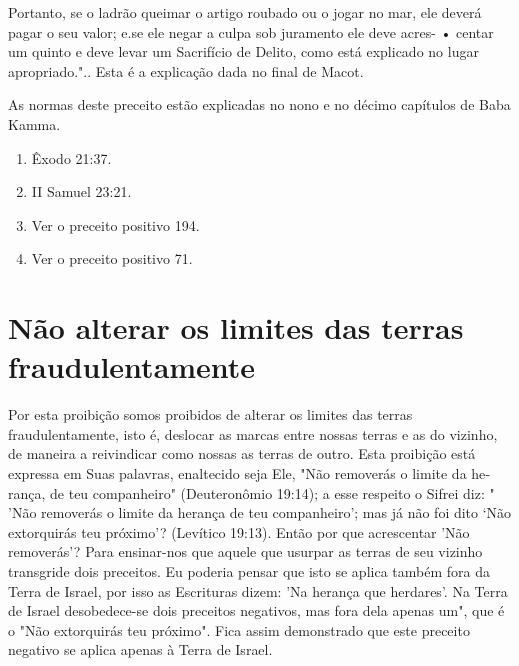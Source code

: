 \begin{itemize}
\begin{enumrate}
\begin{itemize}
\begin{itemize}
\begin{itemize}
Portanto, se o ladrão queimar o artigo roubado ou o jogar no mar, ele
deverá pagar o seu valor; e.se ele negar a culpa sob juramento ele deve
acres- • centar um quinto e deve levar um Sacrifício de Delito, como
está explicado no lugar
apropriado.".. Esta é a explicação
dada no final de Macot.

As normas deste preceito estão explicadas no nono e no décimo ca­pítulos
de Baba Kamma.


\begin{enumerate}
\def\labelenumi{\arabic{enumi}.}
\setcounter{enumi}{402}
\item
 
 Êxodo 21:37.
 
\item
 
 II Samuel 23:21.
 
\item
 
 Ver o preceito positivo 194.
 
\item
 
 Ver o preceito positivo 71.
 
\end{enumerate}



\section{Não alterar os limites das terras fraudulentamente}

Por esta proibição somos proibidos de alterar os limites das terras
fraudulentamente, isto é, deslocar as marcas entre nossas terras e as do
vizinho, de maneira a reivindicar como nossas as terras de outro. Esta
proibição está expressa em Suas palavras, enaltecido seja Ele, "Não
removerás o limite da he­rança, de teu companheiro" (Deuteronômio
19:14); a esse respeito o Sifrei diz: " 'Não removerás o limite da
herança de teu companheiro'; mas já não foi dito `Não extorquirás teu
próximo'? (Levítico 19:13). Então por que acrescentar 'Não removerás'?
Para ensinar-nos que aquele que usurpar as terras de seu vizinho
transgride dois preceitos. Eu poderia pensar que isto se aplica também
fora da Terra de Israel, por isso as Escrituras dizem: 'Na herança que
herdares'. Na Ter­ra de Israel desobedece-se dois preceitos negativos,
mas fora dela apenas um", que é o "Não extorquirás teu próximo". Fica
assim demonstrado que este pre­ceito negativo se aplica apenas à Terra
de Israel.


\end{itemize}
\end{itemize}
\end{itemize}
\end{enumrate}
\end{itemize}
